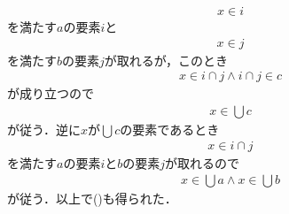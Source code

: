 \begin{description}
\begin{align}
				x \in i
			\end{align}
			を満たす$a$の要素$i$と
			\begin{align}
				x \in j
			\end{align}
			を満たす$b$の要素$j$が取れるが，このとき
			\begin{align}
				x \in i \cap j \wedge i \cap j \in c
			\end{align}
			が成り立つので
			\begin{align}
				x \in \bigcup c
			\end{align}
			が従う．逆に$x$が$\bigcup c$の要素であるとき
			\begin{align}
				x \in i \cap j
			\end{align}
			を満たす$a$の要素$i$と$b$の要素$j$が取れるので
			\begin{align}
				x \in \bigcup a \wedge x \in \bigcup b
			\end{align}
			が従う．以上で()も得られた．
			

\end{description}
